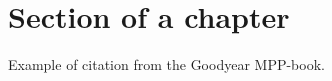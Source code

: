 \section{Section of a chapter}

Example of citation from the Goodyear MPP-book\cite{potter1985mpp}.

